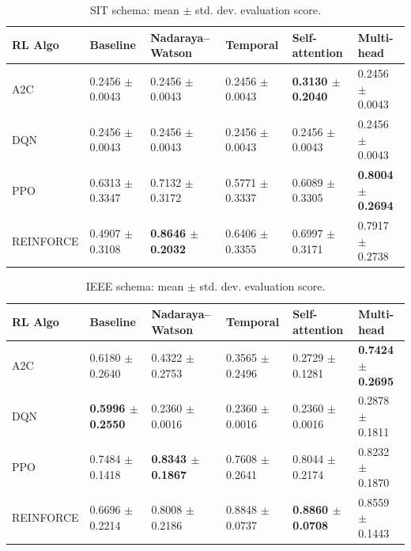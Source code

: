 \documentclass[sn-basic]{sn-jnl}%
\begin{document}
\begin{table}[htbp]
	\centering
	\caption{SIT schema: mean $\pm$ std. dev. evaluation score.}
	\label{tab:sit_main_results}
	\begin{tabular}{l l l l l l}
	\toprule
	\textbf{RL Algo} & \textbf{Baseline} & \textbf{Nadaraya--Watson} & \textbf{Temporal} & \textbf{Self-attention} & \textbf{Multi-head}\\
	\midrule
	A2C & 0.2456 $\pm$ 0.0043 & 0.2456 $\pm$ 0.0043 & 0.2456 $\pm$ 0.0043 & \textbf{0.3130 $\pm$ 0.2040} & 0.2456 $\pm$ 0.0043\\
	DQN & 0.2456 $\pm$ 0.0043 & 0.2456 $\pm$ 0.0043 & 0.2456 $\pm$ 0.0043 & 0.2456 $\pm$ 0.0043 & 0.2456 $\pm$ 0.0043\\
	PPO & 0.6313 $\pm$ 0.3347 & 0.7132 $\pm$ 0.3172 & 0.5771 $\pm$ 0.3337 & 0.6089 $\pm$ 0.3305 & \textbf{0.8004 $\pm$ 0.2694}\\
	REINFORCE & 0.4907 $\pm$ 0.3108 & \textbf{0.8646 $\pm$ 0.2032} & 0.6406 $\pm$ 0.3355 & 0.6997 $\pm$ 0.3171 & 0.7917 $\pm$ 0.2738\\
	\bottomrule
	\end{tabular}
\end{table}

\begin{table}[htbp]
	\centering
	\caption{IEEE schema: mean $\pm$ std. dev. evaluation score.}
	\label{tab:ieee_main_results}
	\begin{tabular}{l l l l l l}
	\toprule
	\textbf{RL Algo} & \textbf{Baseline} & \textbf{Nadaraya--Watson} & \textbf{Temporal} & \textbf{Self-attention} & \textbf{Multi-head}\\
	\midrule
	A2C & 0.6180 $\pm$ 0.2640 & 0.4322 $\pm$ 0.2753 & 0.3565 $\pm$ 0.2496 & 0.2729 $\pm$ 0.1281 & \textbf{0.7424 $\pm$ 0.2695}\\
	DQN & \textbf{0.5996 $\pm$ 0.2550} & 0.2360 $\pm$ 0.0016 & 0.2360 $\pm$ 0.0016 & 0.2360 $\pm$ 0.0016 & 0.2878 $\pm$ 0.1811\\
	PPO & 0.7484 $\pm$ 0.1418 & \textbf{0.8343 $\pm$ 0.1867} & 0.7608 $\pm$ 0.2641 & 0.8044 $\pm$ 0.2174 & 0.8232 $\pm$ 0.1870\\
	REINFORCE & 0.6696 $\pm$ 0.2214 & 0.8008 $\pm$ 0.2186 & 0.8848 $\pm$ 0.0737 & \textbf{0.8860 $\pm$ 0.0708} & 0.8559 $\pm$ 0.1443\\
	\bottomrule
	\end{tabular}
\end{table}
\end{document}
